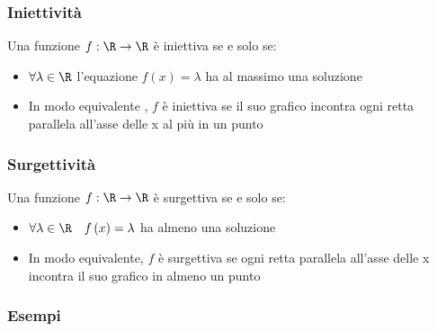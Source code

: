 \subsubsection{Iniettività}

Una funzione $f : \R \rightarrow \R$ è iniettiva se e solo se:
\begin{itemize}
	\item $ \forall \lambda  \in \R$ l'equazione $f\left( x \right) = \lambda$ ha al massimo una soluzione
	\item In modo equivalente , $f$ è iniettiva se il suo grafico incontra ogni retta parallela all'asse delle x al più in un punto
\end{itemize}
\subsubsection{Surgettività}
Una funzione $f : \R \rightarrow \R$ è surgettiva se e solo se:
\begin{itemize}
	\item $ \forall \lambda  \in  \R \quad f\left( x \right) = \lambda$ ha almeno una soluzione
	\item In modo equivalente, $f$ è surgettiva se ogni retta parallela all'asse delle x incontra il suo grafico in almeno un punto

\end{itemize}
\subsubsection{Esempi}


